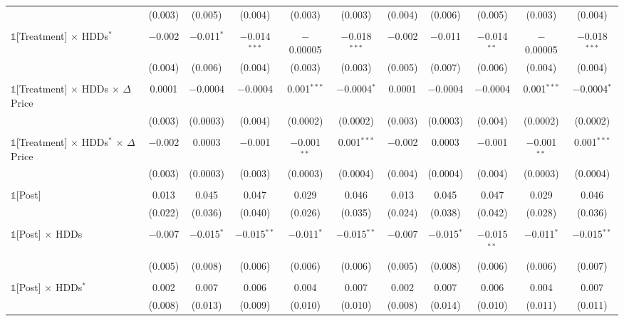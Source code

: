 \begin{table}[!htbp]
\begin{longtable}{@{\extracolsep{0pt}}lcccccccccc}
  & (0.003) & (0.005) & (0.004) & (0.003) & (0.003) & (0.004) & (0.006) & (0.005) & (0.003) & (0.004) \\ 
  & & & & & & & & & & \\ 
 $\mathbb{1}$[Treatment] $\times$ HDDs$^{*}$ & $-$0.002 & $-$0.011$^{*}$ & $-$0.014$^{***}$ & $-$0.00005 & $-$0.018$^{***}$ & $-$0.002 & $-$0.011 & $-$0.014$^{**}$ & $-$0.00005 & $-$0.018$^{***}$ \\ 
  & (0.004) & (0.006) & (0.004) & (0.003) & (0.003) & (0.005) & (0.007) & (0.006) & (0.004) & (0.004) \\ 
  & & & & & & & & & & \\ 
 $\mathbb{1}$[Treatment] $\times$ HDDs $\times$ $\Delta$Price & 0.0001 & $-$0.0004 & $-$0.0004 & 0.001$^{***}$ & $-$0.0004$^{*}$ & 0.0001 & $-$0.0004 & $-$0.0004 & 0.001$^{***}$ & $-$0.0004$^{*}$ \\ 
  & (0.003) & (0.0003) & (0.004) & (0.0002) & (0.0002) & (0.003) & (0.0003) & (0.004) & (0.0002) & (0.0002) \\ 
  & & & & & & & & & & \\ 
 $\mathbb{1}$[Treatment] $\times$ HDDs$^{*}$ $\times$ $\Delta$Price & $-$0.002 & 0.0003 & $-$0.001 & $-$0.001$^{**}$ & 0.001$^{***}$ & $-$0.002 & 0.0003 & $-$0.001 & $-$0.001$^{**}$ & 0.001$^{***}$ \\ 
  & (0.003) & (0.0003) & (0.003) & (0.0003) & (0.0004) & (0.004) & (0.0004) & (0.004) & (0.0003) & (0.0004) \\ 
  & & & & & & & & & & \\ 
 $\mathbb{1}$[Post] & 0.013 & 0.045 & 0.047 & 0.029 & 0.046 & 0.013 & 0.045 & 0.047 & 0.029 & 0.046 \\ 
  & (0.022) & (0.036) & (0.040) & (0.026) & (0.035) & (0.024) & (0.038) & (0.042) & (0.028) & (0.036) \\ 
  & & & & & & & & & & \\ 
 $\mathbb{1}$[Post] $\times$ HDDs & $-$0.007 & $-$0.015$^{*}$ & $-$0.015$^{**}$ & $-$0.011$^{*}$ & $-$0.015$^{**}$ & $-$0.007 & $-$0.015$^{*}$ & $-$0.015$^{**}$ & $-$0.011$^{*}$ & $-$0.015$^{**}$ \\ 
  & (0.005) & (0.008) & (0.006) & (0.006) & (0.006) & (0.005) & (0.008) & (0.006) & (0.006) & (0.007) \\ 
  & & & & & & & & & & \\ 
 $\mathbb{1}$[Post] $\times$ HDDs$^{*}$ & 0.002 & 0.007 & 0.006 & 0.004 & 0.007 & 0.002 & 0.007 & 0.006 & 0.004 & 0.007 \\ 
  & (0.008) & (0.013) & (0.009) & (0.010) & (0.010) & (0.008) & (0.014) & (0.010) & (0.011) & (0.011) \\ 

\end{longtable}
\end{table}

